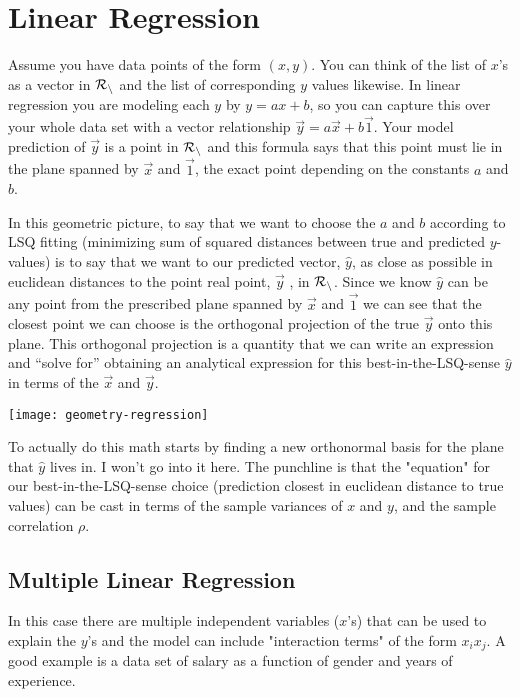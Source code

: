 \section{Linear Regression}
Assume you have data points of the form $(x, y)$. You can think of the list of $x$'s as a vector in $\cal{R}_n$ and the list of corresponding $y$ values likewise. In linear regression you are modeling each $y$ by $y = ax+b$, so you can capture this over your whole data set with a vector relationship $\vec{y} = a\vec{x}+b\vec{1}$. Your model prediction of $\vec{y}$ is a point in $\cal{R}_n$ and this formula says that this point must lie in the plane spanned by $\vec{x}$ and $\vec{1}$, the exact point depending on the constants $a$ and $b$.
\newline

In this geometric picture, to say that we want to choose the $a$ and $b$ according to LSQ fitting (minimizing sum of squared distances between true and predicted $y$-values) is to say that we want to our predicted vector, $\hat{y}$, as close as possible in euclidean distances to the point real point, $\vec{y}$ , in $\cal{R}_n$. Since we know $\hat{y}$ can be any point from the prescribed plane spanned by $\vec{x}$ and $\vec{1}$ we can see that the closest point we can choose is the orthogonal projection of the true $\vec{y}$ onto this plane. This orthogonal projection is a quantity that we can write an expression and ``solve for'' obtaining an analytical expression for this best-in-the-LSQ-sense $\hat{y}$ in terms of the $\vec{x}$ and $\vec{y}$.

\texttt{[image: geometry-regression]} 

To actually do this math starts by finding a new orthonormal basis for the plane that $\hat{y}$ lives in. I won't go into it here. The punchline is that the "equation" for our best-in-the-LSQ-sense choice (prediction closest in euclidean distance to true values) can be cast in terms of the sample variances of $x$ and $y$, and the sample correlation $\rho$. 

\subsection{Multiple Linear Regression}
In this case there are multiple independent variables ($x$'s) that can be used to explain the $y$'s and the model can include "interaction terms" of the form $x_ix_j$. A good example is a data set of salary as a function of gender and years of experience. 


